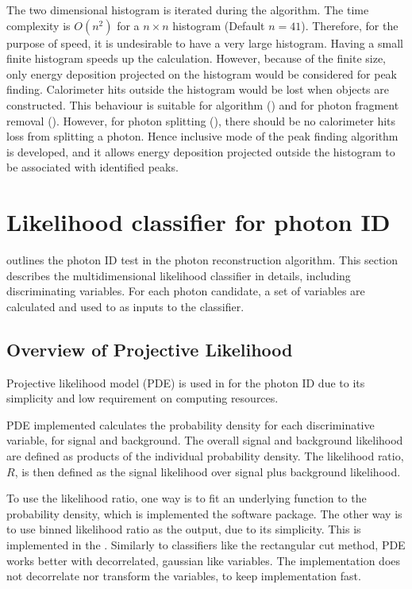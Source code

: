 The two dimensional histogram is iterated during the algorithm. The time complexity is $O(n^2)$ for a $n \times n$ histogram (Default $n = 41$). Therefore, for the purpose of speed, it is undesirable to have a very large histogram. Having a small finite histogram speeds up the calculation. However, because of the finite size, only energy deposition projected on the histogram would be considered for peak finding. Calorimeter hits outside the histogram would be lost when \ShowerPeak objects are constructed. This behaviour is suitable for \PhotonReconstruction algorithm () and for photon fragment removal (). However, for photon splitting (), there should be no calorimeter hits loss from splitting a photon. Hence inclusive mode of the peak finding algorithm is developed, and it allows energy deposition projected outside the histogram to be associated with identified peaks.


\section{Likelihood classifier for photon ID}
\label{sec:photonLikelihood}

 outlines the photon ID test in the photon reconstruction algorithm. This section describes the multidimensional likelihood classifier in details, including discriminating variables. For each photon candidate, a set of variables are calculated and used to as inputs to the classifier.

\subsection{Overview of Projective Likelihood}
\label{sec:photonPDE}
Projective likelihood model (PDE) is used in \pandora for the photon ID due to its simplicity and low requirement on computing resources.

PDE implemented calculates the probability density for each discriminative variable, for signal and background. The overall signal and background likelihood are defined as products of the individual probability density. The likelihood ratio, $R$, is then defined as the signal likelihood over signal plus background likelihood.

To use the likelihood ratio, one way is to fit an underlying function to the probability density, which is implemented the \TMVA software package. The other way is to use binned likelihood ratio as the output, due to its simplicity. This is implemented in the \pandora. Similarly to classifiers like the rectangular cut method, PDE works better with decorrelated, gaussian like variables. The \pandora implementation does not decorrelate nor transform the variables, to keep implementation fast.

